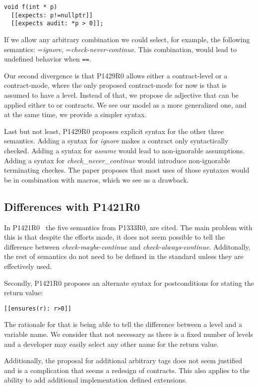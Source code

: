 \begin{lstlisting}
void f(int * p)
  [[expects: p!=nullptr]]
  [[expects audit: *p > 0]];
\end{lstlisting}

If we allow any arbitrary combination we could select, for example, the following
semantics: =\emph{ignore}, =\emph{check-never-continue}.
This combination, would lead to undefined behavior when \texttt{==}.

Our second divergence is that P1429R0 allows either a contract-level or a contract-mode,
where the only proposed contract-mode for now is 
that is assumed to have a  level.
Instead of that, we propose de  adjective that can be applied either
to  or  contracts.
We see our model as a more generalized one, and at the same time, we provide
a simpler syntax.

Last but not least, P1429R0 proposes explicit syntax for the other three semantics.
Adding a syntax for \emph{ignore} makes a contract only syntactically checked.
Adding a syntax for \emph{assume} would lead to non-ignorable assumptions.
Adding a syntax for \emph{check\_never\_continue} would introduce non-ignorable
terminating checkes. The paper proposes that most uses of those syntaxes would
be in combination with macros, which we see as a drawback.

\subsection{Differences with P1421R0}

In P1421R0~\cite{p1421r0} the five semantics from P1333R0, are cited. The main
problem with this is that despite the efforts made, it does not seem possible
to tell the difference between \emph{check-maybe-continue} and
\emph{check-always-continue}. Additonally, the rest of semantics do not
need to be defined in the standard unless they are effectively used.

Secondly, P1421R0 proposes an alternate syntax for postconditions for stating
the return value:

\begin{lstlisting}
[[ensures(r): r>0]]
\end{lstlisting}

The rationale for that is being able to tell the difference between a level and 
a variable name. We consider that not necessary as there is a fixed number of
levels and a developer may easily select any other name for the return value.

Additionally, the proposal for additional arbitrary tags does not seem justified
and is a complication that seems a redesign of contracts. This also applies to
the ability to add additional implementation defined extensions.

